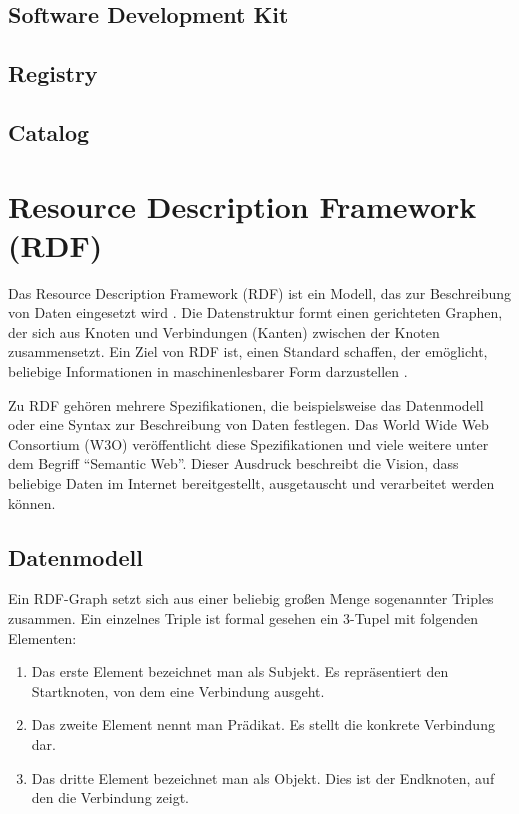 	\subsection{Software Development Kit}
	\subsection{Registry}
	\subsection{Catalog}

\section{Resource Description Framework (RDF)}

Das Resource Description Framework (RDF) ist ein Modell, das zur Beschreibung von Daten eingesetzt wird \cite[vgl.][]{w3c2014rdf}. Die Datenstruktur formt einen gerichteten Graphen, der sich aus Knoten und Verbindungen (Kanten) zwischen der Knoten zusammensetzt. Ein Ziel von RDF ist, einen Standard schaffen, der emöglicht, beliebige Informationen in maschinenlesbarer Form darzustellen \cite[vgl.][Sektion 2]{w3c2014rdfprimer}.

Zu RDF gehören mehrere Spezifikationen, die beispielsweise das Datenmodell oder eine Syntax zur Beschreibung von Daten festlegen. Das World Wide Web Consortium (W3O) veröffentlicht diese Spezifikationen und viele weitere unter dem Begriff "`Semantic Web"'. Dieser Ausdruck beschreibt die Vision, dass beliebige Daten im Internet bereitgestellt, ausgetauscht und verarbeitet werden können. \cite[vgl.][]{w3c2014semanticweb}

	\subsection{Datenmodell}
	
	Ein RDF-Graph setzt sich aus einer beliebig großen Menge sogenannter Triples zusammen. \cite[vgl.][Sektion 3.1]{w3c2014rdfconcepts} Ein einzelnes Triple ist formal gesehen ein 3-Tupel mit folgenden Elementen:
	\begin{enumerate}
		\item Das erste Element bezeichnet man als Subjekt. Es repräsentiert den Startknoten, von dem eine Verbindung ausgeht.
		\item Das zweite Element nennt man Prädikat. Es stellt die konkrete Verbindung dar.
		\item Das dritte Element bezeichnet man als Objekt. Dies ist der Endknoten, auf den die Verbindung zeigt. 
	\end{enumerate}
	
